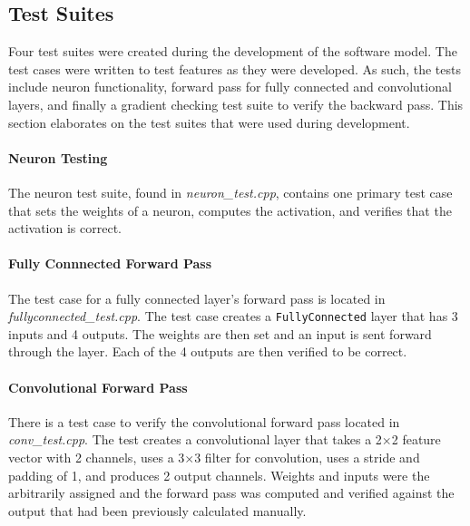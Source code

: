 \subsection{Test Suites}
Four test suites were created during the development of the software model. The test cases were written to test features as they were developed. As such, the tests include neuron functionality, forward pass for fully connected and convolutional layers, and finally a gradient checking test suite to verify the backward pass. This section elaborates on the test suites that were used during development.

\paragraph{Neuron Testing}
The neuron test suite, found in \textit{neuron\_test.cpp}, contains one primary test case that sets the weights of a neuron, computes the activation, and verifies that the activation is correct.

\paragraph{Fully Connnected Forward Pass}
The test case for a fully connected layer's forward pass is located in \textit{fullyconnected\_test.cpp}. The test case creates a \texttt{FullyConnected} layer that has 3 inputs and 4 outputs. The weights are then set and an input is sent forward through the layer. Each of the 4 outputs are then verified to be correct.

\paragraph{Convolutional Forward Pass}
There is a test case to verify the convolutional forward pass located in \textit{conv\_test.cpp}. The test creates a convolutional layer that takes a 2$\times$2 feature vector with 2 channels, uses a 3$\times$3 filter for convolution, uses a stride and padding of 1, and produces 2 output channels. Weights and inputs were the arbitrarily assigned and the forward pass was computed and verified against the output that had been previously calculated manually.

